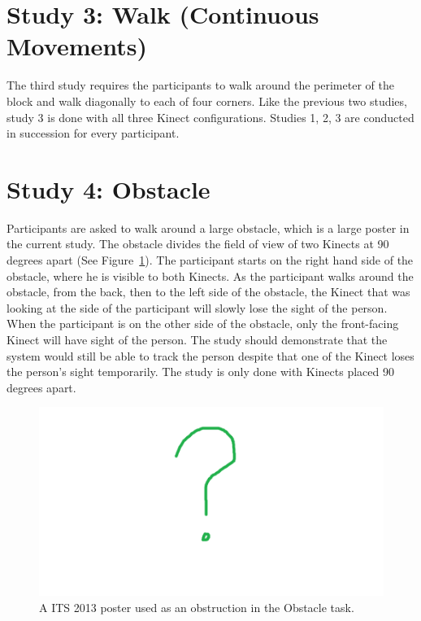 \section{Study 3: Walk (Continuous Movements)}
\label{sec:studies_stationary}

The third study requires the participants to walk around the perimeter of the block and walk diagonally to each of four corners. Like the previous two studies, study 3 is done with all three Kinect configurations. Studies 1, 2, 3 are conducted in succession for every participant.

\section{Study 4: Obstacle}
\label{sec:studies_stationary}

Participants are asked to walk around a large obstacle, which is a large poster in the current study. The obstacle divides the field of view of two Kinects at 90 degrees apart (See Figure~\ref{fig:obstacle}). The participant starts on the right hand side of the obstacle, where he is visible to both Kinects. As the participant walks around the obstacle, from the back, then to the left side of the obstacle, the Kinect that was looking at the side of the participant will slowly lose the sight of the person. When the participant is on the other side of the obstacle, only the front-facing Kinect will have sight of the person. The study should demonstrate that the system would still be able to track the person despite that one of the Kinect loses the person's sight temporarily. The study is only done with Kinects placed 90 degrees apart.

\begin{figure}[!h]
  \centering

  \includegraphics[width=0.8\linewidth]{figs/missing}
  
  \caption{A ITS 2013 poster used as an obstruction in the Obstacle task.}
  
  \label{fig:obstacle}
\end{figure}

